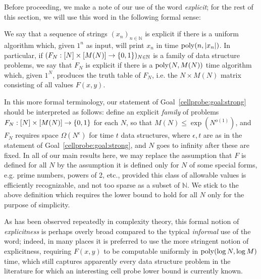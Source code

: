 Before proceeding, we make a note of our use of the word \emph{explicit}; for the rest of this section, we will use this word in the following formal sense:
\begin{definition}
We say that a sequence of strings $(x_n)_{n \in \mathbb{N}}$ is explicit if there is a uniform algorithm which, given $1^n$ as input, will print $x_n$ in time $\mathrm{poly}(n,|x_n|)$.
In particular, if $(F_N:[N] \times [M(N)] \to \{0,1\})_{N \in \mathbb{N}}$ is a family of data structure problems, we say that $F_N$ is explicit if there is a $\mathrm{poly}(N,M(N))$ time algorithm which, given $1^N$, produces the truth table of $F_N$, i.e. the $N \times M(N)$ matrix consisting of all values $F(x,y)$.
\end{definition}

In this more formal terminology, our statement of Goal~\ref{cellprobe:goal:strong} should be interpreted as follows: define an explicit \emph{family} of problems $F_N:[N] \times [M(N)] \to \{0,1\}$ for each $N$, so that $M(N) \leq \exp(N^{o(1)})$, and $F_N$ requires space $\Omega(N^\epsilon)$ for time $t$ data structures, where $\epsilon,t$ are as in the statement of Goal~\ref{cellprobe:goal:strong}, and $N$ goes to infinity after these are fixed.
In all of our main results here, we may replace the assumption that $F$ is defined for all $N$ by the assumption it is defined only for $N$ of some special forms, e.g. prime numbers, powers of 2, etc., provided this class of allowable values is efficiently recognizable, and not too sparse as a subset of $\mathbb{N}$. We stick to the above definition which requires the lower bound to hold for all $N$ only for the purpose of simplicity.

As has been observed repeatedly in complexity theory, this formal notion of \emph{explicitness} is perhaps overly broad compared to the typical \emph{informal} use of the word; indeed, in many places it is preferred to use the more stringent notion of explicitness, requiring $F(x,y)$ to be computable uniformly in $\mathrm{poly}(\log N, \log M)$ time, which still captures apparently every data structure problem in the literature for which an interesting cell probe lower bound is currently known.
